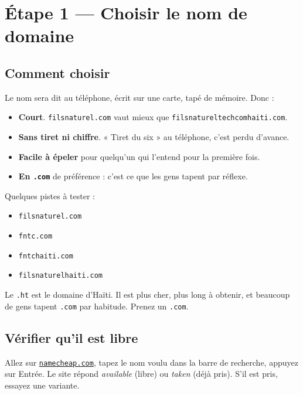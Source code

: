 \documentclass[11pt,a4paper]{article}
\newcommand{\champ}[1]{\textit{#1}}
\newcommand{\saisir}[1]{\texttt{#1}}
\newcommand{\lien}[2]{\href{#1}{\texttt{#2}}}
\begin{document}
\section{Étape 1 — Choisir le nom de domaine}

\subsection{Comment choisir}

Le nom sera dit au téléphone, écrit sur une carte, tapé de mémoire. Donc :

\begin{itemize}
  \item \textbf{Court}. \saisir{filsnaturel.com} vaut mieux que \saisir{filsnatureltechcomhaiti.com}.
  \item \textbf{Sans tiret ni chiffre}. « Tiret du six » au téléphone, c'est perdu d'avance.
  \item \textbf{Facile à épeler} pour quelqu'un qui l'entend pour la première fois.
  \item \textbf{En \saisir{.com}} de préférence : c'est ce que les gens tapent par réflexe.
\end{itemize}

Quelques pistes à tester :

\begin{itemize}
  \item \saisir{filsnaturel.com}
  \item \saisir{fntc.com}
  \item \saisir{fntchaiti.com}
  \item \saisir{filsnaturelhaiti.com}
\end{itemize}

\begin{conseil}
Le \saisir{.ht} est le domaine d'Haïti. Il est plus cher, plus long à obtenir,
et beaucoup de gens tapent \saisir{.com} par habitude. Prenez un \saisir{.com}.
\end{conseil}

\subsection{Vérifier qu'il est libre}

Allez sur \lien{https://www.namecheap.com}{namecheap.com}, tapez le nom voulu
dans la barre de recherche, appuyez sur Entrée. Le site répond \champ{available}
(libre) ou \champ{taken} (déjà pris). S'il est pris, essayez une variante.
\end{document}

